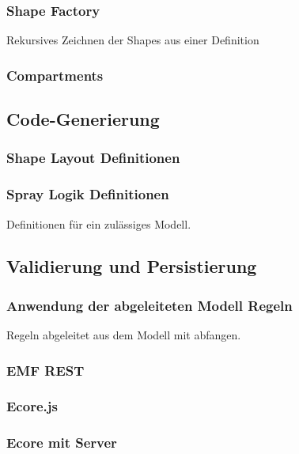 \subsubsection{Shape Factory}

Rekursives Zeichnen der Shapes aus einer Definition

\subsubsection{Compartments}


\subsection{Code-Generierung}

\subsubsection{Shape Layout Definitionen}

\subsubsection{Spray Logik Definitionen}

Definitionen für ein zulässiges Modell.

\subsection{Validierung und Persistierung}

\subsubsection{Anwendung der abgeleiteten Modell Regeln}

Regeln abgeleitet aus dem Modell mit \dd abfangen.

\subsubsection{EMF REST}

\subsubsection{Ecore.js}

\subsubsection{Ecore mit Server}


